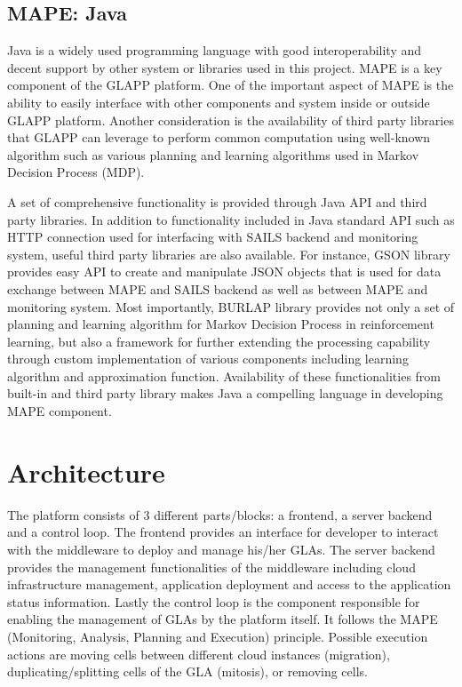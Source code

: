 \documentclass{seal_thesis}
\begin{document}
\subsection{MAPE: Java}
Java is a widely used programming language with good interoperability and decent support by other system or libraries used in this project.
MAPE is a key component of the GLAPP platform.
One of the important aspect of MAPE is the ability to easily interface with other components and system inside or outside GLAPP platform.
Another consideration is the availability of third party libraries that GLAPP can leverage to perform common computation using well-known algorithm such as various planning and learning algorithms used in Markov Decision Process (MDP).

A set of comprehensive functionality is provided through Java API and third party libraries.
In addition to functionality included in Java standard API such as HTTP connection used for interfacing with SAILS backend and monitoring system, useful third party libraries are also available.
For instance, GSON library  provides easy API to create and manipulate JSON objects that is used for data exchange between MAPE and SAILS backend as well as between MAPE and monitoring system.
Most importantly, BURLAP library  provides not only a set of planning and learning algorithm for Markov Decision Process in reinforcement learning, but also a framework for further extending the processing capability through custom implementation of various components including learning algorithm and approximation function.
Availability of these functionalities from built-in and third party library makes Java a compelling language in developing MAPE component.


\section{Architecture}
The platform consists of 3 different parts/blocks: a frontend, a server backend and a control loop.
The frontend provides an interface for developer to interact with the middleware to deploy and manage his/her GLAs.
The server backend provides the management functionalities of the middleware including cloud infrastructure management, application deployment and access to the application status information.
Lastly the control loop is the component responsible for enabling the management of GLAs by the platform itself.
It follows the MAPE (Monitoring, Analysis, Planning and Execution) principle.
Possible execution actions are moving cells between different cloud instances (migration), duplicating/splitting cells of the GLA (mitosis), or removing cells.
\end{document}
